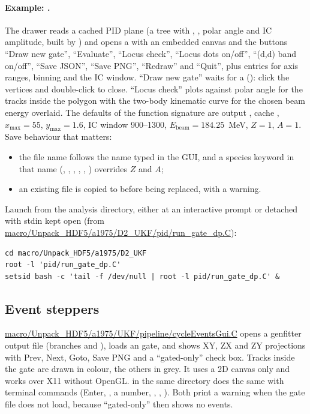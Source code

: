 \paragraph{Example: .} The drawer reads a cached PID plane (a tree
 with \sqdedx, \brho, polar angle and IC amplitude, built by )
and opens a  with an embedded canvas and the buttons ``Draw new gate'',
``Evaluate'', ``Locus check'', ``Locus dots on/off'', ``(d,d) band on/off'', ``Save JSON'',
``Save PNG'', ``Redraw'' and ``Quit'', plus entries for axis ranges, binning and the IC window.
``Draw new gate'' waits for a  (): click the vertices
and double-click to close. ``Locus check'' plots \brho{} against polar angle for the tracks inside
the polygon with the two-body kinematic curve for the chosen beam energy overlaid. The defaults of
the function signature are output , cache
, $x_\mathrm{max}=55$, $y_\mathrm{max}=1.6$, IC window
900--1300, $E_\mathrm{beam}=184.25$~MeV, $Z=1$, $A=1$. Save behaviour that matters:
\begin{itemize}
  \item the file name follows the name typed in the GUI, and a species keyword in that name
        (, , , , , )
        overrides $Z$ and $A$;
  \item an existing file is copied to  before being replaced, with a warning.
\end{itemize}
Launch from the analysis directory, either at an interactive prompt or detached with stdin kept
open (from \url{macro/Unpack_HDF5/a1975/D2_UKF/pid/run_gate_dp.C}):
\begin{verbatim}
cd macro/Unpack_HDF5/a1975/D2_UKF
root -l 'pid/run_gate_dp.C'
setsid bash -c 'tail -f /dev/null | root -l pid/run_gate_dp.C' &
\end{verbatim}

\subsection{Event steppers}

\url{macro/Unpack_HDF5/a1975/UKF/pipeline/cycleEventsGui.C} opens a genfitter output file
(branches  and ), loads an  gate, and
shows XY, ZX and ZY projections with Prev, Next, Goto, Save PNG and a ``gated-only'' check box.
Tracks inside the gate are drawn in colour, the others in grey. It uses a 2D canvas only and works
over X11 without OpenGL.  in the same directory does the same with terminal
commands (Enter, , a number, , , ). Both print a warning when the
gate file does not load, because ``gated-only'' then shows no events.

